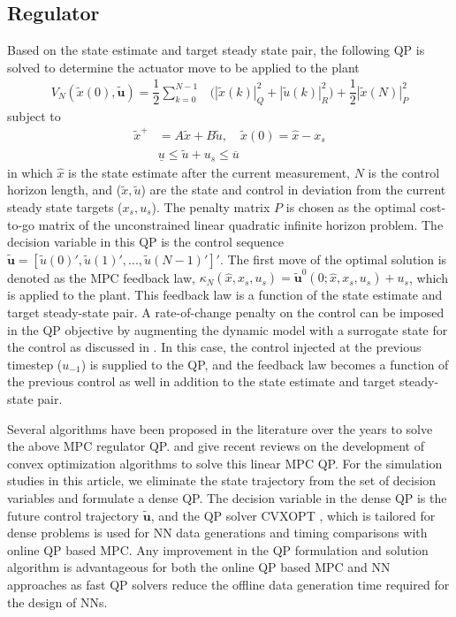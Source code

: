 \documentclass[preprint,5p, twocolumn, authoryear]{elsarticle}
\begin{document}
\subsection{Regulator}
Based on the state estimate and
target steady state pair,
the following QP is solved to determine the 
actuator move to be applied to the plant
\begin{align} \label{eqn:regulator}
    V_N(\tilde{x}(0), \mathbf{\tilde{u}}) = \dfrac{1}{2}\sum_{k=0}^{N-1} & \Big(|\tilde{x}(k)|^2_Q  + |\tilde{u}(k)|^2_R \Big) + \dfrac{1}{2}|\tilde{x}(N)|^2_P
\end{align}
subject to 
\begin{align}
    \tilde{x}^+ &= A\tilde{x} + B\tilde{u}, \quad \tilde{x}(0) = \hat{x} - x_s \\
    &\underline{u} \leq \tilde{u} + u_s \leq \overline{u}
    \label{eqn:regulator_constraints}
\end{align}
in which $\hat{x}$ is the state estimate after the current measurement,
$N$ is the control 
horizon length, and
($\tilde{x}, \tilde{u}$) are the state and control 
in deviation from the current steady state targets ($x_s, u_s$). 
The penalty matrix $P$ is chosen as the 
optimal cost-to-go matrix of the unconstrained 
linear quadratic infinite horizon problem.
The decision variable in this 
QP is the control sequence 
$\mathbf{\tilde{u}} = [\tilde{u}(0)', \tilde{u}(1)', ..., \tilde{u}(N-1)']'$.
The first move of the optimal solution is denoted 
as the MPC feedback law,
$\kappa_N(\hat{x}, x_s, u_s) = 
\mathbf{\tilde{u}}^0(0;\hat{x}, x_s, u_s) + u_s$, 
which is applied to the plant. This feedback law is a function of the 
state estimate and target steady-state pair. A rate-of-change 
penalty on the control can be imposed in the QP objective
by augmenting the dynamic model with a surrogate state 
for the control as discussed in \cite*{rao:rawlings:1999}. 
In this case, 
the control injected at the previous timestep
($u_{-1}$) is supplied to the QP, 
and the feedback law becomes a function of the previous control 
as well in addition to the state estimate
and target steady-state pair.

Several algorithms have been proposed in the literature over
the years to solve the above MPC regulator QP. 
\cite*{kouzoupis:frison:zanelli:diehl:2018} and
\cite*{wright:2019} give recent reviews on the development 
of convex optimization algorithms to solve this linear MPC QP.
For the simulation studies in this article, we eliminate the 
state trajectory from the set of decision variables  
and formulate a dense QP. The decision variable in the dense QP
is the future control trajectory $\mathbf{\tilde{u}}$, 
and the QP solver CVXOPT \citep*{vandenberghe:2010},
which is tailored for dense problems
is used for NN data generations and timing 
comparisons with online QP based MPC.
Any improvement in the QP formulation
and solution algorithm is advantageous
for both the online QP based MPC 
and NN approaches
as fast QP solvers reduce the 
offline data generation time required for the 
design of NNs.
\end{document}
